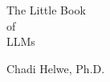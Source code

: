\documentclass[oneside,11pt]{memoir}
\begin{document}
\thispagestyle{empty}

\begin{center}


{\huge The Little Book\\[0.75ex] of\\[1.75ex] LLMs}

\vspace*{4ex}

Chadi Helwe, Ph.D.


\end{center}

\newpage









{
\everymath{\color{black}}
\tableofcontents* %
}

\clearpage

\listoffigures*
{}



\end{document}
